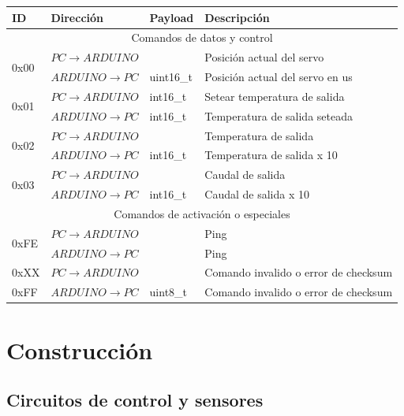 \documentclass[12pt]{article}
\begin{document}
\begin{table}[H]
\begin{center}
\begin{tabular}{|l|l|l|l|}
\hline
ID & Dirección & Payload & Descripción \\
\hline
\multicolumn{4}{|c|}{Comandos de datos y control} \\
\hline
\multirow{2}{0pt}{0x00} & $PC \longrightarrow ARDUINO$ &  & Posición actual del servo \\
\cline{2-4} & $ARDUINO \longrightarrow PC$ & uint16\_t & Posición actual del servo en us \\
\hline
\multirow{2}{0pt}{0x01} & $PC \longrightarrow ARDUINO$ & int16\_t & Setear temperatura de salida \\
\cline{2-4} & $ARDUINO \longrightarrow PC$ & int16\_t & Temperatura de salida seteada \\
\hline
\multirow{2}{0pt}{0x02} & $PC \longrightarrow ARDUINO$ &  & Temperatura de salida \\
\cline{2-4} & $ARDUINO \longrightarrow PC$ & int16\_t & Temperatura de salida x 10 \\
\hline
\multirow{2}{0pt}{0x03} & $PC \longrightarrow ARDUINO$ &  & Caudal de salida \\
\cline{2-4} & $ARDUINO \longrightarrow PC$ & int16\_t & Caudal de salida x 10 \\
\hline
\multicolumn{4}{|c|}{Comandos de activación o especiales} \\
\hline
\multirow{2}{0pt}{0xFE} & $PC \longrightarrow ARDUINO$ &  & Ping \\
\cline{2-4} & $ARDUINO \longrightarrow PC$ &  & Ping \\
\hline
0xXX & $PC \longrightarrow ARDUINO$ &  & Comando invalido o error de checksum \\
\hline
0xFF & $ARDUINO \longrightarrow PC$ & uint8\_t & Comando invalido o error de checksum \\
\hline
\end{tabular}
\end{center}
\end{table}

\section{Construcción}

\subsection{Circuitos de control y sensores}
\end{document}
